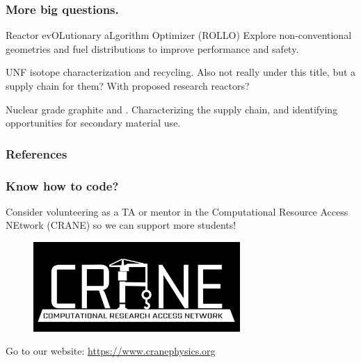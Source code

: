 \documentclass[9pt]{beamer}
\begin{document}
  \begin{frame}
    \frametitle{More big questions.} %
    \begin{block}{Reactor evOLutionary aLgorithm Optimizer (ROLLO)}
      Explore non-conventional geometries and fuel distributions to improve performance and safety.
    \end{block}
    \begin{block}{UNF isotope characterization and recycling.}
      Also not really under this title, but a supply chain for them? With proposed research reactors?
    \end{block}
    \begin{block}{Nuclear grade graphite and .}
      Characterizing the supply chain, and identifying opportunities for secondary material use.
    \end{block}
  \end{frame}






\begin{frame}[allowframebreaks]
  \frametitle{References}
  
  {\footnotesize  }

\end{frame}

\appendix

\begin{frame}
    \frametitle{Know how to code?}
    Consider volunteering as a TA or mentor in the Computational Resource Access NEtwork (CRANE) so we can support more students!
    \begin{figure}
        \centering
        \includegraphics[width=0.7\textwidth]{images/CRANE_logo_inverted.png}
    \end{figure}
    Go to our website: \url{https://www.cranephysics.org}
\end{frame}

\end{document}
